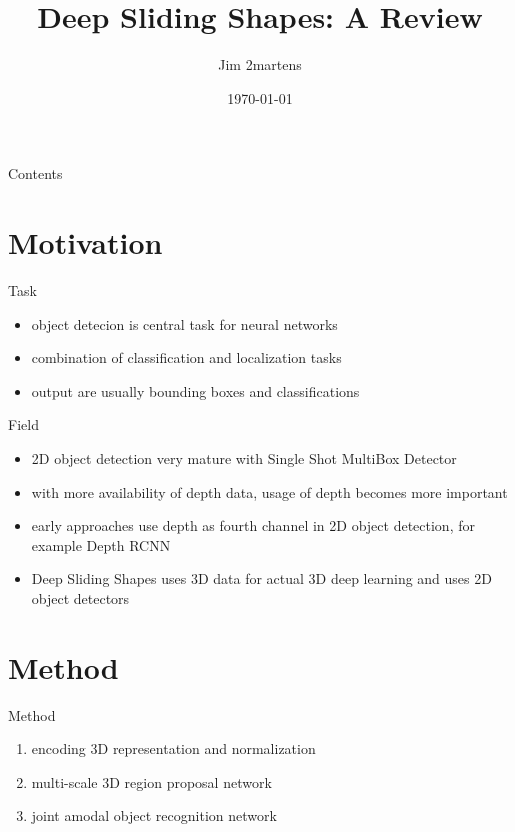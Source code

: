\documentclass{beamer}
\begin{document}
\author{Jim 2martens}
\title{Deep Sliding Shapes: A Review}
\date{\today}

\begin{frame}
    \titlepage
\end{frame}

\begin{frame}{Contents}
    \tableofcontents
\end{frame}

\section{Motivation}
\begin{frame}{Task}
    \begin{itemize}
        \item object detecion is central task for neural networks
        \vfill
        \item combination of classification and localization tasks
        \vfill
        \item output are usually bounding boxes and classifications
    \end{itemize}
\end{frame}

\begin{frame}{Field}
    \begin{itemize}
        \item 2D object detection very mature with Single Shot MultiBox Detector\cite{Liu2016}
        \vfill
        \item with more availability of depth data, usage of depth becomes more
              important
        \vfill
        \item early approaches use depth as fourth channel in 2D object detection,
              for example Depth RCNN\cite{Gupta2015}
        \vfill
        \item Deep Sliding Shapes\cite{Song2016} uses 3D data for actual 3D deep
              learning and uses 2D object detectors
    \end{itemize}
\end{frame}

\section{Method}
\begin{frame}{Method}
    \begin{enumerate}
        \item encoding 3D representation and normalization
        \vfill
        \item multi-scale 3D region proposal network
        \vfill
        \item joint amodal object recognition network
    \end{enumerate}
\end{frame}
\end{document}
